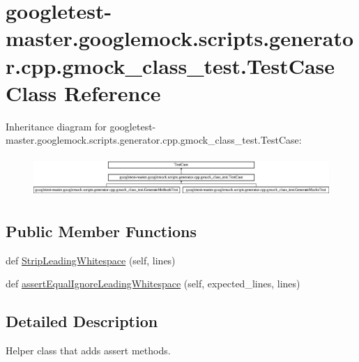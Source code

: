 \hypertarget{classgoogletest-master_1_1googlemock_1_1scripts_1_1generator_1_1cpp_1_1gmock__class__test_1_1_test_case}{}\section{googletest-\/master.googlemock.\+scripts.\+generator.\+cpp.\+gmock\+\_\+class\+\_\+test.\+Test\+Case Class Reference}
\label{classgoogletest-master_1_1googlemock_1_1scripts_1_1generator_1_1cpp_1_1gmock__class__test_1_1_test_case}
Inheritance diagram for googletest-\/master.googlemock.\+scripts.\+generator.\+cpp.\+gmock\+\_\+class\+\_\+test.\+Test\+Case\+:\begin{figure}[H]
\begin{center}
\leavevmode
\includegraphics[height=1.538462cm]{d9/dbd/classgoogletest-master_1_1googlemock_1_1scripts_1_1generator_1_1cpp_1_1gmock__class__test_1_1_test_case}
\end{center}
\end{figure}
\subsection*{Public Member Functions}
\begin{DoxyCompactItemize}
\item 
def \mbox{\hyperlink{classgoogletest-master_1_1googlemock_1_1scripts_1_1generator_1_1cpp_1_1gmock__class__test_1_1_test_case_a93504c223b117e26d36a2d53238825a0}{Strip\+Leading\+Whitespace}} (self, lines)
\item 
def \mbox{\hyperlink{classgoogletest-master_1_1googlemock_1_1scripts_1_1generator_1_1cpp_1_1gmock__class__test_1_1_test_case_ad985aa014e9cbd1f4b8a0b757dda676c}{assert\+Equal\+Ignore\+Leading\+Whitespace}} (self, expected\+\_\+lines, lines)
\end{DoxyCompactItemize}


\subsection{Detailed Description}
\begin{DoxyVerb}Helper class that adds assert methods.\end{DoxyVerb}
 

